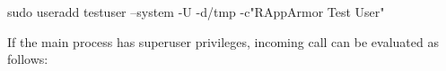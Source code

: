 \begin{appendix}
\begin{codeblock}
sudo useradd testuser --system -U -d/tmp -c"RAppArmor Test User"
\end{codeblock}
If the main \R process has superuser privileges, incoming call can be
evaluated as follows:

\begin{knitrout}\mycodesize
{}\color{fgcolor}\begin{kframe}
\begin{alltt}
\hlstd{(}\hlstd{(),}  \hlstd{=} \hlstd{,}  \hlstd{=} \hlstd{,}  \hlstd{=} \hlstd{)}
\end{alltt}
\end{kframe}
\end{knitrout}

\end{appendix}
